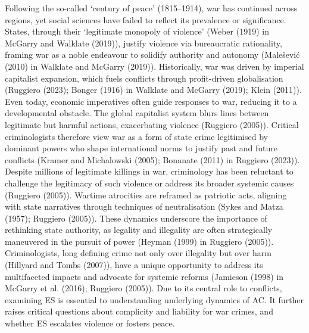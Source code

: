 \documentclass[
]{article}
\begin{document}
Following the so-called `century of peace' (1815--1914), war has
continued across regions, yet social sciences have failed to reflect its
prevalence or significance. States, through their `legitimate monopoly
of violence' (Weber (1919) in McGarry and Walklate (2019)), justify
violence via bureaucratic rationality, framing war as a noble endeavour
to solidify authority and autonomy (Malešević (2010) in Walklate and
McGarry (2019)). Historically, war was driven by imperial capitalist
expansion, which fuels conflicts through profit-driven globalisation
(Ruggiero (2023); Bonger (1916) in Walklate and McGarry (2019); Klein
(2011)). Even today, economic imperatives often guide responses to war,
reducing it to a developmental obstacle. The global capitalist system
blurs lines between legitimate but harmful actions, exacerbating
violence (Ruggiero (2005)). Critical criminologists therefore view war
as a form of state crime legitimised by dominant powers who shape
international norms to justify past and future conflicts (Kramer and
Michalowski (2005); Bonanate (2011) in Ruggiero (2023)). Despite
millions of legitimate killings in war, criminology has been reluctant
to challenge the legitimacy of such violence or address its broader
systemic causes (Ruggiero (2005)). Wartime atrocities are reframed as
patriotic acts, aligning with state narratives through techniques of
neutralisation (Sykes and Matza (1957); Ruggiero (2005)). These dynamics
underscore the importance of rethinking state authority, as legality and
illegality are often strategically maneuvered in the pursuit of power
(Heyman (1999) in Ruggiero (2005)). Criminologists, long defining crime
not only over illegality but over harm (Hillyard and Tombs (2007)), have
a unique opportunity to address its multifaceted impacts and advocate
for systemic reforms (Jamieson (1998) in McGarry et al. (2016); Ruggiero
(2005)). Due to its central role to conflicts, examining ES is essential
to understanding underlying dynamics of AC. It further raises critical
questions about complicity and liability for war crimes, and whether ES
escalates violence or fosters peace.
\end{document}
